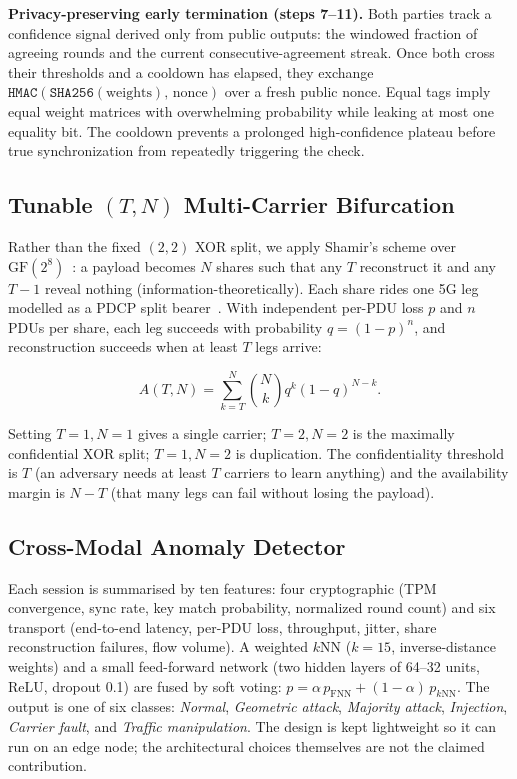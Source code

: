 \documentclass[conference]{IEEEtran}
\begin{document}
\textbf{Privacy-preserving early termination (steps 7--11).}
Both parties track a confidence signal derived only from public outputs: the windowed
fraction of agreeing rounds and the current consecutive-agreement streak. Once both
cross their thresholds and a cooldown has elapsed, they exchange
$\texttt{HMAC}(\texttt{SHA256}(\text{weights}),\,\text{nonce})$ over a fresh
public nonce. Equal tags imply equal weight matrices with overwhelming probability
while leaking at most one equality bit. The cooldown prevents a prolonged
high-confidence plateau before true synchronization from repeatedly triggering
the check.

\subsection{Tunable $(T,N)$ Multi-Carrier Bifurcation}

Rather than the fixed $(2,2)$ XOR split, we apply Shamir's scheme over
$\mathrm{GF}(2^8)$~\cite{shamir1979share}: a payload becomes $N$ shares such that
any $T$ reconstruct it and any $T-1$ reveal nothing (information-theoretically). Each
share rides one 5G leg modelled as a PDCP split bearer~\cite{tgpp38323}. With
independent per-PDU loss $p$ and $n$ PDUs per share, each leg succeeds with
probability $q=(1-p)^{n}$, and reconstruction succeeds when at least $T$ legs arrive:

\begin{equation}
A(T,N)=\sum_{k=T}^{N}\!\binom{N}{k}q^{k}(1-q)^{N-k}.
\label{eq:avail}
\end{equation}

Setting $T{=}1,N{=}1$ gives a single carrier; $T{=}2,N{=}2$ is the maximally
confidential XOR split; $T{=}1,N{=}2$ is duplication. The confidentiality threshold
is $T$ (an adversary needs at least $T$ carriers to learn anything) and the
availability margin is $N-T$ (that many legs can fail without losing the payload).

\subsection{Cross-Modal Anomaly Detector}

Each session is summarised by ten features: four cryptographic (TPM convergence,
sync rate, key match probability, normalized round count) and six transport
(end-to-end latency, per-PDU loss, throughput, jitter, share reconstruction
failures, flow volume). A weighted $k$NN ($k{=}15$, inverse-distance weights) and a
small feed-forward network (two hidden layers of 64--32 units, ReLU, dropout 0.1)
are fused by soft voting:
$p = \alpha\,p_{\text{FNN}}+(1-\alpha)\,p_{k\text{NN}}$.
The output is one of six classes: \textit{Normal}, \textit{Geometric attack},
\textit{Majority attack}, \textit{Injection}, \textit{Carrier fault}, and
\textit{Traffic manipulation}. The design is kept lightweight so it can run
on an edge node; the architectural choices themselves are not the claimed contribution.
\end{document}
